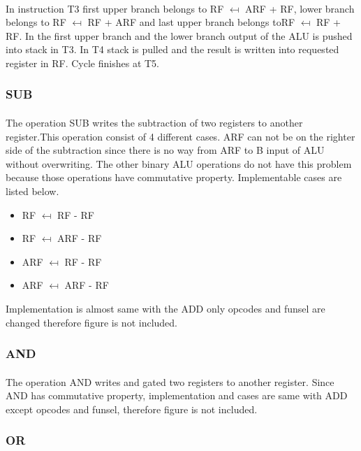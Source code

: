 \documentclass{article}
\begin{document}
\paragraph{}
In instruction T3 first upper branch belongs to RF $\mapsfrom$ ARF + RF, lower branch belongs to RF $\mapsfrom$ RF + ARF and last upper branch belongs to\newline RF $\mapsfrom$ RF + RF. In the first upper branch and the lower branch output of the ALU is pushed into stack in T3. In T4 stack is pulled and the result is written into requested register in RF. Cycle finishes at T5.
\newpage
\subsubsection{SUB}
\paragraph{}
The operation SUB writes the subtraction of two registers to another register.This operation consist of 4 different cases. ARF can not be on the righter side of the subtraction since there is no way from ARF to B input of ALU without overwriting. The other binary ALU operations do not have this problem because those operations have commutative property. Implementable cases are listed below. 
\begin{itemize}
    \item RF $\mapsfrom$ RF - RF
    \item RF $\mapsfrom$ ARF - RF
    \item ARF $\mapsfrom$ RF - RF
    \item ARF $\mapsfrom$ ARF - RF
\end{itemize}
Implementation is almost same with the ADD only opcodes and funsel are changed therefore figure is not included. 
\subsubsection{AND}
\paragraph{}
The operation AND writes  and gated two registers to another register. Since AND has commutative property, implementation and cases are same with ADD except opcodes and funsel, therefore figure is not included. 
\subsubsection{OR}
\end{document}
